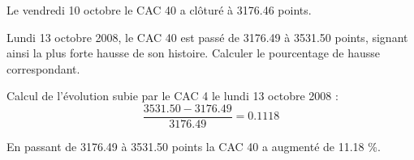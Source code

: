 \begin{questions}
\begin{solution}
			Le vendredi 10 octobre le CAC 40 a clôturé à  \num{3176.46} points.
		\end{solution}
	
	\question Lundi 13 octobre 2008, le CAC 40 est passé de \num{3176.49} à \num{3531.50} points, signant ainsi la plus forte hausse de son histoire. 
	Calculer le pourcentage de hausse correspondant.  
		\begin{solution}
			
			Calcul de l'évolution subie par le CAC 4 le lundi 13 octobre 2008 :
			\begin{equation*}
				\frac{\num{3531.50} - \num{3176.49}}{\num{3176.49}} = \num{0.1118}
			\end{equation*}
			
			En passant de \num{3176.49} à \num{3531.50} points la CAC 40 a augmenté de \num{11.18} \%. 
		\end{solution}
\end{questions} 
